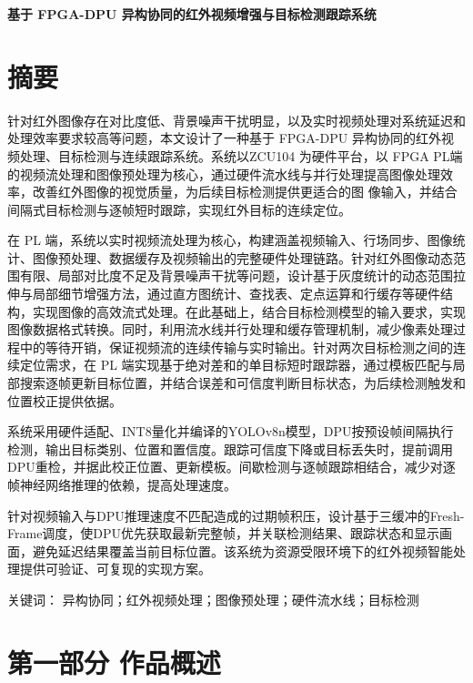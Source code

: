 \documentclass[UTF8,a4paper,12pt,fontset=windows]{ctexart}
\begin{document}
\pagestyle{plain}

\begin{center}
    \Large\bfseries
    基于 FPGA-DPU 异构协同的红外视频增强与目标检测跟踪系统
\end{center}

\section*{摘要}

针对红外图像存在对比度低、背景噪声干扰明显，以及实时视频处理对系统延迟和处理效率要求较高等问题，本文设计了一种基于 FPGA-DPU 异构协同的红外视频处理、目标检测与连续跟踪系统。系统以ZCU104 为硬件平台，以 FPGA PL端的视频流处理和图像预处理为核心，通过硬件流水线与并行处理提高图像处理效率，改善红外图像的视觉质量，为后续目标检测提供更适合的图 像输入，并结合间隔式目标检测与逐帧短时跟踪，实现红外目标的连续定位。

在 PL 端，系统以实时视频流处理为核心，构建涵盖视频输入、行场同步、图像统计、图像预处理、数据缓存及视频输出的完整硬件处理链路。针对红外图像动态范围有限、局部对比度不足及背景噪声干扰等问题，设计基于灰度统计的动态范围拉伸与局部细节增强方法，通过直方图统计、查找表、定点运算和行缓存等硬件结构，实现图像的高效流式处理。在此基础上，结合目标检测模型的输入要求，实现图像数据格式转换。同时，利用流水线并行处理和缓存管理机制，减少像素处理过程中的等待开销，保证视频流的连续传输与实时输出。针对两次目标检测之间的连续定位需求，在 PL 端实现基于绝对差和的单目标短时跟踪器，通过模板匹配与局部搜索逐帧更新目标位置，并结合误差和可信度判断目标状态，为后续检测触发和位置校正提供依据。

系统采用硬件适配、INT8量化并编译的YOLOv8n模型，DPU按预设帧间隔执行检测，输出目标类别、位置和置信度。跟踪可信度下降或目标丢失时，提前调用DPU重检，并据此校正位置、更新模板。间歇检测与逐帧跟踪相结合，减少对逐帧神经网络推理的依赖，提高处理速度。

针对视频输入与DPU推理速度不匹配造成的过期帧积压，设计基于三缓冲的Fresh-Frame调度，使DPU优先获取最新完整帧，并关联检测结果、跟踪状态和显示画面，避免延迟结果覆盖当前目标位置。该系统为资源受限环境下的红外视频智能处理提供可验证、可复现的实现方案。

关键词： 异构协同；红外视频处理；图像预处理；硬件流水线；目标检测

\clearpage
\section*{第一部分 作品概述}

\end{document}
